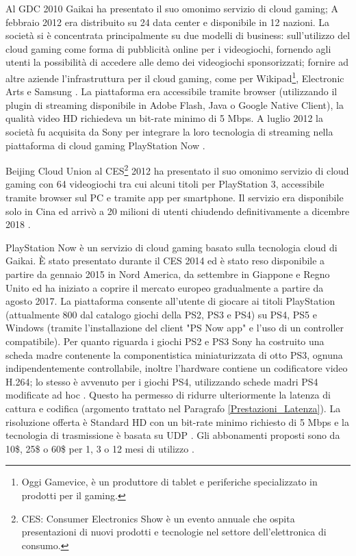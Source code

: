 Al GDC 2010 Gaikai ha presentato il suo omonimo servizio di cloud gaming; A febbraio 2012 era distribuito su 24 data center e disponibile in 12 nazioni. La società si è concentrata principalmente su due modelli di business: sull'utilizzo del cloud gaming come forma di pubblicità online per i videogiochi, fornendo agli utenti la possibilità di accedere alle demo dei videogiochi sponsorizzati; fornire ad altre aziende l'infrastruttura per il cloud gaming, come per Wikipad\footnote{Oggi Gamevice, è un produttore di tablet e periferiche specializzato in prodotti per il gaming.}, Electronic Arts e Samsung \parencite{Gaikai_open_platform}. La piattaforma era accessibile tramite browser (utilizzando il plugin di streaming disponibile in Adobe Flash, Java o Google Native Client), la qualità video HD richiedeva un bit-rate minimo di 5 Mbps. A luglio 2012 la società fu acquisita da Sony per integrare la loro tecnologia di streaming nella piattaforma di cloud gaming PlayStation Now \parencite{Gaikai_Beta}.

Beijing Cloud Union al CES\footnote{CES: Consumer Electronics Show è un evento annuale che ospita presentazioni di nuovi prodotti e tecnologie nel settore dell'elettronica di consumo.} 2012 ha presentato il suo omonimo servizio di cloud gaming con 64 videogiochi tra cui alcuni titoli per PlayStation 3, accessibile tramite browser sul PC e tramite app per smartphone. Il servizio era disponibile solo in Cina ed arrivò a 20 milioni di utenti chiudendo definitivamente a dicembre 2018 \parencite{CloudUnion}.

PlayStation Now è un servizio di cloud gaming basato sulla tecnologia cloud di Gaikai. È stato presentato durante il CES 2014 ed è stato reso disponibile a partire da gennaio 2015 in Nord America, da settembre in Giappone e Regno Unito ed ha iniziato a coprire il mercato europeo gradualmente a partire da agosto 2017. La piattaforma consente all'utente di giocare ai titoli PlayStation (attualmente 800 dal catalogo giochi della PS2, PS3 e PS4) su PS4, PS5 e Windows (tramite l'installazione del client "PS Now app" e l'uso di un controller compatibile). Per quanto riguarda i giochi PS2 e PS3 Sony ha costruito una scheda madre contenente la componentistica miniaturizzata di otto PS3, ognuna indipendentemente controllabile, inoltre l'hardware contiene un codificatore video H.264; lo stesso è avvenuto per i giochi PS4, utilizzando schede madri PS4 modificate ad hoc \parencite{PlayStation_Now_Chip}. Questo ha permesso di ridurre ulteriormente la latenza di cattura e codifica (argomento trattato nel Paragrafo \ref{Prestazioni_Latenza}). La risoluzione offerta è Standard HD con un bit-rate minimo richiesto di 5 Mbps e la tecnologia di trasmissione è basata su UDP \parencite{A_Network_Analysis_on_Cloud_Gaming_Stadia_GeForce_Now_and_PSNow}. Gli abbonamenti proposti sono da 10\$, 25\$ o 60\$ per 1, 3 o 12 mesi di utilizzo \parencite{PlayStation_Now}.

